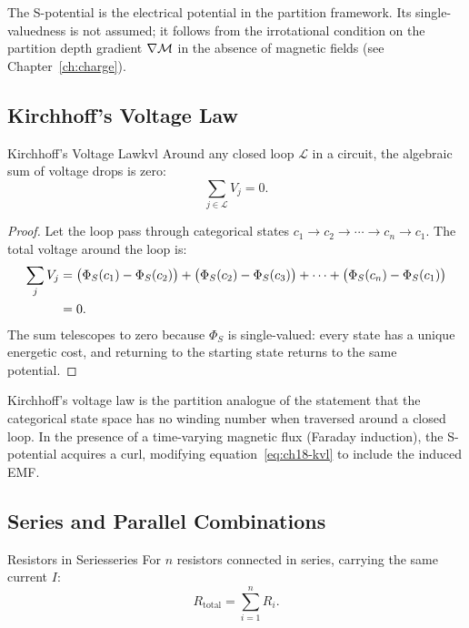The S-potential is the electrical potential in the partition framework.
Its single-valuedness is not assumed; it follows from the irrotational
condition on the partition depth gradient $\nabla\mathcal{M}$ in the absence of
magnetic fields (see Chapter~\ref{ch:charge}).

\subsection{Kirchhoff's Voltage Law}

\begin{consequence}{Kirchhoff's Voltage Law}{kvl}
Around any closed loop $\mathcal{L}$ in a circuit, the algebraic sum of
voltage drops is zero:
\begin{equation}
  \sum_{j \in \mathcal{L}} V_j = 0.
  \label{eq:ch18-kvl}
\end{equation}
\end{consequence}

\begin{proof}
Let the loop pass through categorical states $c_1 \to c_2 \to \cdots
\to c_n \to c_1$.  The total voltage around the loop is:
\begin{align}
  \sum_{j} V_j
    &= \bigl(\Phi_S(c_1) - \Phi_S(c_2)\bigr)
     + \bigl(\Phi_S(c_2) - \Phi_S(c_3)\bigr)
     + \cdots
     + \bigl(\Phi_S(c_n) - \Phi_S(c_1)\bigr) \notag\\
    &= 0.
\end{align}
The sum telescopes to zero because $\Phi_S$ is single-valued: every state
has a unique energetic cost, and returning to the starting state returns to
the same potential.
\end{proof}

\begin{remark}
  Kirchhoff's voltage law is the partition analogue of the statement that
  the categorical state space has no winding number when traversed around a
  closed loop.  In the presence of a time-varying magnetic flux (Faraday
  induction), the S-potential acquires a curl, modifying
  equation~\eqref{eq:ch18-kvl} to include the induced EMF.
\end{remark}

\subsection{Series and Parallel Combinations}

\begin{consequence}{Resistors in Series}{series}
For $n$ resistors connected in series, carrying the same current $I$:
\begin{equation}
  R_{\mathrm{total}} = \sum_{i=1}^n R_i.
  \label{eq:ch18-series}
\end{equation}
\end{consequence}

